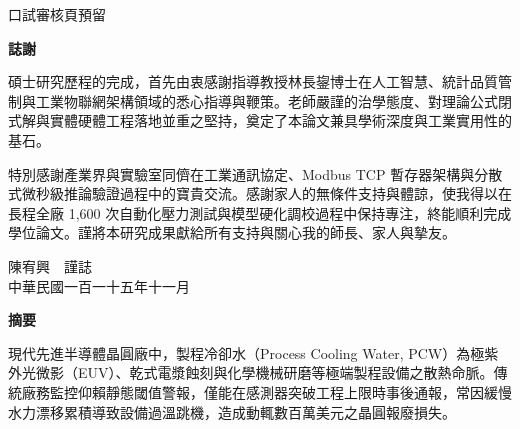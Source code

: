 \documentclass[fontset=none, a4paper, 12pt]{ctexart}
\begin{document}
\restoregeometry
\clearpage

\thispagestyle{empty}
\vspace*{\fill}
\begin{center}
    \Large 口試審核頁預留
\end{center}
\vspace*{\fill}
\clearpage

\clearpage
{}
\pagestyle{empty}

\begin{center}
    \large\bfseries 誌謝
\end{center}
\vspace{0.5em}

碩士研究歷程的完成，首先由衷感謝指導教授林長鋆博士在人工智慧、統計品質管制與工業物聯網架構領域的悉心指導與鞭策。老師嚴謹的治學態度、對理論公式閉式解與實體硬體工程落地並重之堅持，奠定了本論文兼具學術深度與工業實用性的基石。

特別感謝產業界與實驗室同儕在工業通訊協定、Modbus TCP 暫存器架構與分散式微秒級推論驗證過程中的寶貴交流。感謝家人的無條件支持與體諒，使我得以在長程全廠 1,600 次自動化壓力測試與模型硬化調校過程中保持專注，終能順利完成學位論文。謹將本研究成果獻給所有支持與關心我的師長、家人與摯友。

\vspace{2em}
\begin{flushright}
陳宥興　謹誌\\
中華民國一百一十五年十一月
\end{flushright}

\clearpage
\pagestyle{plain}
\setcounter{page}{1}

{}
\begin{center}
\large\bfseries 摘要
\end{center}
\vspace{0.5em}

現代先進半導體晶圓廠中，製程冷卻水（Process Cooling Water, PCW）為極紫外光微影（EUV）、乾式電漿蝕刻與化學機械研磨等極端製程設備之散熱命脈。傳統廠務監控仰賴靜態閾值警報，僅能在感測器突破工程上限時事後通報，常因緩慢水力漂移累積導致設備過溫跳機，造成動輒數百萬美元之晶圓報廢損失。
\end{document}
